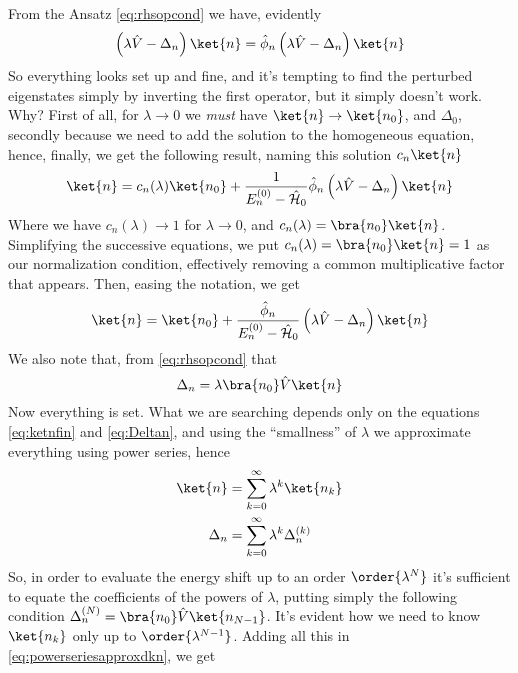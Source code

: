 \documentclass[a4paper, 11pt]{book}
\newcommand{\1}{\opr{\mathds{1}}}
\newcommand{\ham}{\mathcal{H}}
\newcommand{\opr}[1]{\hat{#1}}
\theoremstyle{plain}
\begin{document}
	From the Ansatz \eqref{eq:rhsopcond} we have, evidently
	\begin{equation*}
		\left( \lambda\opr{V}-\Delta_n \right)\ket{n}=\opr{\phi}_n\left( \lambda\opr{V}-\Delta_n \right)\ket{n}
	\end{equation*}
	So everything looks set up and fine, and it's tempting to find the perturbed eigenstates simply by inverting the first operator, but it simply doesn't work. Why? First of all, for $\lambda\to0$ we \emph{must} have $\ket{n}\to\ket{n_0}$, and $\Delta_0$, secondly because we need to add the solution to the homogeneous equation, hence, finally, we get the following result, naming this solution $c_n\ket{n}$
	\begin{equation}
		\ket{n}=c_n(\lambda)\ket{n_0}+\frac{1}{E_n^{(0)}-\opr{\ham}_0}\opr{\phi}_n\left( \lambda\opr{V}-\Delta_n \right)\ket{n}
		\label{eq:kncnk0invphivkn}
	\end{equation}
	Where we have $c_n(\lambda)\to1$ for $\lambda\to0$, and $c_n(\lambda)=\bra{n_0}\ket{n}$.\\
	Simplifying the successive equations, we put $c_n(\lambda)=\bra{n_0}\ket{n}=1$ as our normalization condition, effectively removing a common multiplicative factor that appears. Then, easing the notation, we get
	\begin{equation}
		\ket{n}=\ket{n_0}+\frac{\opr{\phi}_n}{E_n^{(0)}-\opr{\ham}_0}\left( \lambda\opr{V}-\Delta_n \right)\ket{n}
		\label{eq:ketnfin}
	\end{equation}
	We also note that, from \eqref{eq:rhsopcond} that
	\begin{equation}
		\Delta_n=\lambda\bra{n_0}\opr{V}\ket{n}
		\label{eq:Deltan}
	\end{equation}
	Now everything is set. What we are searching depends only on the equations \eqref{eq:ketnfin} and \eqref{eq:Deltan}, and using the ``smallness'' of $\lambda$ we approximate everything using power series, hence
	\begin{equation}
		\begin{aligned}
			\ket{n}&=\sum_{k=0}^{\infty}\lambda^k\ket{n_k}\\
			\Delta_n&=\sum_{k=0}^{\infty}\lambda^k\Delta_n^{(k)}
		\end{aligned}
		\label{eq:powerseriesapproxdkn}
	\end{equation}
	So, in order to evaluate the energy shift up to an order $\order{\lambda^N}$ it's sufficient to equate the coefficients of the powers of $\lambda$, putting simply the following condition $\Delta_n^{(N)}=\bra{n_0}\opr{V}\ket{n_{N-1}}$. It's evident how we need to know $\ket{n_k}$ only up to $\order{\lambda^{N-1}}$. Adding all this in \eqref{eq:powerseriesapproxdkn}, we get
\end{document}
